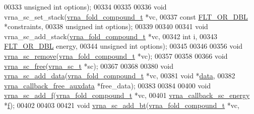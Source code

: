 \begin{DoxyCode}
00333                     \textcolor{keywordtype}{unsigned} \textcolor{keywordtype}{int}          options);
00334 
00335 
00336 \textcolor{keywordtype}{void} vrna\_sc\_set\_stack(\hyperlink{group__fold__compound_structvrna__fc__s}{vrna\_fold\_compound\_t} *vc,
00337                        \textcolor{keyword}{const} \hyperlink{group__data__structures_ga31125aeace516926bf7f251f759b6126}{FLT\_OR\_DBL}     *constraints,
00338                        \textcolor{keywordtype}{unsigned} \textcolor{keywordtype}{int}         options);
00339 
00340 
00341 \textcolor{keywordtype}{void} vrna\_sc\_add\_stack(\hyperlink{group__fold__compound_structvrna__fc__s}{vrna\_fold\_compound\_t} *vc,
00342                        \textcolor{keywordtype}{int}                  i,
00343                        \hyperlink{group__data__structures_ga31125aeace516926bf7f251f759b6126}{FLT\_OR\_DBL}           energy,
00344                        \textcolor{keywordtype}{unsigned} \textcolor{keywordtype}{int}         options);
00345 
00346 
00356 \textcolor{keywordtype}{void} \hyperlink{group__soft__constraints_ga73cdc07b9a199c614367bebef0f2c41a}{vrna\_sc\_remove}(\hyperlink{group__fold__compound_structvrna__fc__s}{vrna\_fold\_compound\_t} *vc);
00357 
00358 
00366 \textcolor{keywordtype}{void} \hyperlink{group__soft__constraints_ga6d55446448d69346fc313b993c4fb3e8}{vrna\_sc\_free}(\hyperlink{group__soft__constraints_structvrna__sc__s}{vrna\_sc\_t} *sc);
00367 
00368 
00380 \textcolor{keywordtype}{void} \hyperlink{group__soft__constraints_ga15c6d52471ec97897e2bb7f964f5deb6}{vrna\_sc\_add\_data}(\hyperlink{group__fold__compound_structvrna__fc__s}{vrna\_fold\_compound\_t}        *vc,
00381                       \textcolor{keywordtype}{void}                        *\hyperlink{group__soft__constraints_a7574680143df97b9029146c2150bf06d}{data},
00382                       \hyperlink{group__fold__compound_ga7806651f51b195013839a218b3bbd5a3}{vrna\_callback\_free\_auxdata}  *free\_data);
00383 
00384 
00400 \textcolor{keywordtype}{void} \hyperlink{group__soft__constraints_ga8c7d907ec0125cd61c04e0908010a4e9}{vrna\_sc\_add\_f}(\hyperlink{group__fold__compound_structvrna__fc__s}{vrna\_fold\_compound\_t}     *vc,
00401                    \hyperlink{group__soft__constraints_ga88a266695d9e25cc12114dceb7b4565e}{vrna\_callback\_sc\_energy}  *\hyperlink{group__soft__constraints_a32dc86090237888c75491bbd4861a04b}{f});
00402 
00403 
00421 \textcolor{keywordtype}{void} \hyperlink{group__soft__constraints_gabde7d07a79bb9a8f4721aee247b674ea}{vrna\_sc\_add\_bt}(\hyperlink{group__fold__compound_structvrna__fc__s}{vrna\_fold\_compound\_t}        *vc,

\end{DoxyCode}
